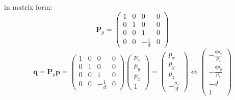 \documentclass[10pt, a4paper]{article}
\begin{document}
            in matrix form: 
                \begin{equation*}
                    \textbf{P}_p = 
                    \begin{pmatrix}
                        1 & 0 & 0 & 0 \\
                        0 & 1 & 0 & 0 \\
                        0 & 0 & 1 & 0 \\
                        0 & 0 & -\frac{1}{d} & 0
                    \end{pmatrix}
                \end{equation*}
                \begin{equation*} 
                    \textbf{q} = \textbf{P}_p\textbf{p} = 
                    \begin{pmatrix}
                    1 & 0 & 0 & 0 \\
                    0 & 1 & 0 & 0 \\
                    0 & 0 & 1 & 0 \\
                    0 & 0 & -\frac{1}{d} & 0
                    \end{pmatrix}
                    \begin{pmatrix}
                        p_x\\
                        p_y\\
                        p_z\\
                        1
                    \end{pmatrix}
                    =
                    \begin{pmatrix}
                        p_x\\
                        p_y\\
                        p_z\\
                        -\frac{p_z}{d}
                    \end{pmatrix}
                    \iff
                    \begin{pmatrix}
                        -\frac{dp_x}{p_z}\\
                        -\frac{dp_y}{p_z}\\
                        -d\\
                        1
                    \end{pmatrix}
                \end{equation*}
                
\end{document}
